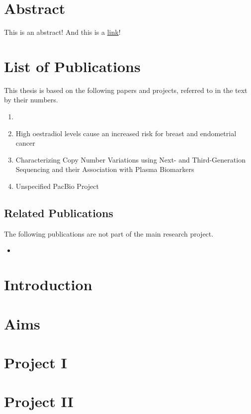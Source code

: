 \documentclass[]{scrbook}
\begin{document}
\printglossary

\chapter{Abstract}
    This is an abstract! And this is a \href{https://schmytzi.github.io/}{link}!

\chapter{List of Publications}
This thesis is based on the following papers and projects, referred to in the text by their numbers.

\begin{enumerate}[label=\Roman*.]
    \item {}
    \item High oestradiol levels cause an increased risk for breast and endometrial cancer
    \item Characterizing Copy Number Variations using Next- and Third-Generation Sequencing and their Association with Plasma Biomarkers
    \item Unspecified PacBio Project
\end{enumerate}

\section*{Related Publications}
The following publications are not part of the main research project.
\begin{itemize}
    \item {}
\end{itemize}

\tableofcontents

\mainmatter

\chapter{Introduction}

\chapter{Aims}

\chapter{Project I}

\chapter{Project II}
\end{document}
